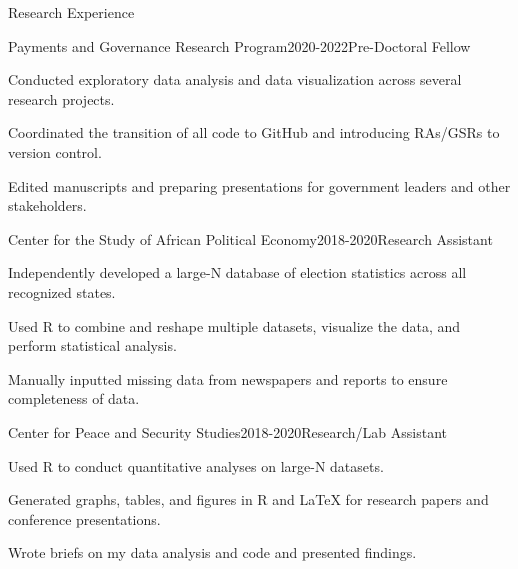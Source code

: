 \documentclass[10pt]{resume} %
\begin{document}
	\begin{rSection}{Research Experience}
		
		\begin{rSubsection}{Payments and Governance Research Program}{2020-2022}{Pre-Doctoral Fellow}{}
		\item Conducted exploratory data analysis and data visualization across several research projects.
		\item Coordinated the transition of all code to GitHub and introducing RAs/GSRs to version control. 
		\item Edited manuscripts and preparing presentations for government leaders and other stakeholders.
		\end{rSubsection}
		
		\begin{rSubsection}{Center for the Study of African Political Economy}{2018-2020}{Research Assistant}{}
		\item Independently developed a large-N database of election statistics across all recognized states.
		\item Used R to combine and reshape multiple datasets, visualize the data, and perform statistical analysis.
		\item Manually inputted missing data from newspapers and reports to ensure completeness of data. 
		\end{rSubsection}
		
		\begin{rSubsection}{Center for Peace and Security Studies}{2018-2020}{Research/Lab Assistant}{}
		\item Used R to conduct quantitative analyses on large-N datasets.
		\item Generated graphs, tables, and figures in R and LaTeX for research papers and conference presentations.
		\item Wrote briefs on my data analysis and code and presented findings. 
			
		\end{rSubsection}
		
		

\end{rSection}
\end{document}

